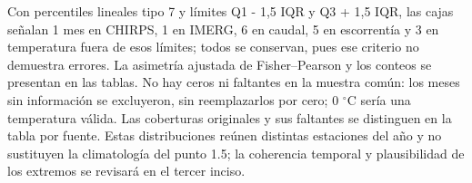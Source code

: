 \documentclass[10pt,a4paper]{article}
\begin{document}
Con percentiles lineales tipo 7 y límites Q1 - 1,5 IQR y Q3 + 1,5 IQR, las cajas señalan 1 mes en CHIRPS, 1 en IMERG, 6 en caudal, 5 en escorrentía y 3 en temperatura fuera de esos límites; todos se conservan, pues ese criterio no demuestra errores. La asimetría ajustada de Fisher--Pearson y los conteos se presentan en las tablas. No hay ceros ni faltantes en la muestra común: los meses sin información se excluyeron, sin reemplazarlos por cero; 0 $^\circ$C sería una temperatura válida. Las coberturas originales y sus faltantes se distinguen en la tabla por fuente. Estas distribuciones reúnen distintas estaciones del año y no sustituyen la climatología del punto 1.5; la coherencia temporal y plausibilidad de los extremos se revisará en el tercer inciso.
\begin{center}
\end{center}
\begin{center}
\end{center}
\begin{center}
\end{center}
\end{document}
